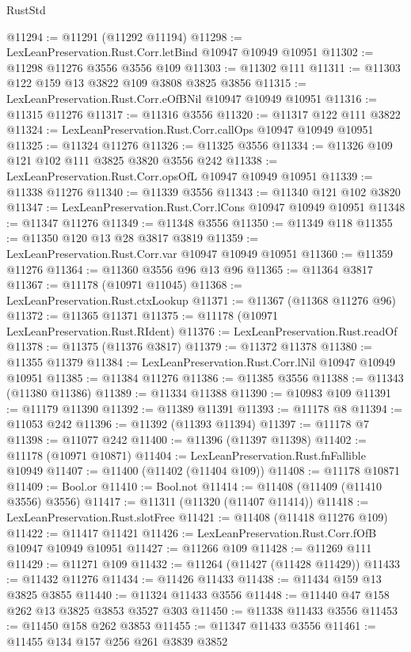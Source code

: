 \begin{lexlean}{RustStd}
\begin{coremodule}
@11294 := @11291 (@11292 @11194)
@11298 := LexLeanPreservation.Rust.Corr.letBind @10947 @10949 @10951
@11302 := @11298 @11276 @3556 @3556 @109
@11303 := @11302 @111
@11311 := @11303 @122 @159 @13 @3822 @109 @3808 @3825 @3856
@11315 := LexLeanPreservation.Rust.Corr.eOfBNil @10947 @10949 @10951
@11316 := @11315 @11276
@11317 := @11316 @3556
@11320 := @11317 @122 @111 @3822
@11324 := LexLeanPreservation.Rust.Corr.callOps @10947 @10949 @10951
@11325 := @11324 @11276
@11326 := @11325 @3556
@11334 := @11326 @109 @121 @102 @111 @3825 @3820 @3556 @242
@11338 := LexLeanPreservation.Rust.Corr.opsOfL @10947 @10949 @10951
@11339 := @11338 @11276
@11340 := @11339 @3556
@11343 := @11340 @121 @102 @3820
@11347 := LexLeanPreservation.Rust.Corr.lCons @10947 @10949 @10951
@11348 := @11347 @11276
@11349 := @11348 @3556
@11350 := @11349 @118
@11355 := @11350 @120 @13 @28 @3817 @3819
@11359 := LexLeanPreservation.Rust.Corr.var @10947 @10949 @10951
@11360 := @11359 @11276
@11364 := @11360 @3556 @96 @13 @96
@11365 := @11364 @3817
@11367 := @11178 (@10971 @11045)
@11368 := LexLeanPreservation.Rust.ctxLookup
@11371 := @11367 (@11368 @11276 @96)
@11372 := @11365 @11371
@11375 := @11178 (@10971 LexLeanPreservation.Rust.RIdent)
@11376 := LexLeanPreservation.Rust.readOf
@11378 := @11375 (@11376 @3817)
@11379 := @11372 @11378
@11380 := @11355 @11379
@11384 := LexLeanPreservation.Rust.Corr.lNil @10947 @10949 @10951
@11385 := @11384 @11276
@11386 := @11385 @3556
@11388 := @11343 (@11380 @11386)
@11389 := @11334 @11388
@11390 := @10983 @109
@11391 := @11179 @11390
@11392 := @11389 @11391
@11393 := @11178 @8
@11394 := @11053 @242
@11396 := @11392 (@11393 @11394)
@11397 := @11178 @7
@11398 := @11077 @242
@11400 := @11396 (@11397 @11398)
@11402 := @11178 (@10971 @10871)
@11404 := LexLeanPreservation.Rust.fnFallible @10949
@11407 := @11400 (@11402 (@11404 @109))
@11408 := @11178 @10871
@11409 := Bool.or
@11410 := Bool.not
@11414 := @11408 (@11409 (@11410 @3556) @3556)
@11417 := @11311 (@11320 (@11407 @11414))
@11418 := LexLeanPreservation.Rust.slotFree
@11421 := @11408 (@11418 @11276 @109)
@11422 := @11417 @11421
@11426 := LexLeanPreservation.Rust.Corr.fOfB @10947 @10949 @10951
@11427 := @11266 @109
@11428 := @11269 @111
@11429 := @11271 @109
@11432 := @11264 (@11427 (@11428 @11429))
@11433 := @11432 @11276
@11434 := @11426 @11433
@11438 := @11434 @159 @13 @3825 @3855
@11440 := @11324 @11433 @3556
@11448 := @11440 @47 @158 @262 @13 @3825 @3853 @3527 @303
@11450 := @11338 @11433 @3556
@11453 := @11450 @158 @262 @3853
@11455 := @11347 @11433 @3556
@11461 := @11455 @134 @157 @256 @261 @3839 @3852

\end{coremodule}
\end{lexlean}
